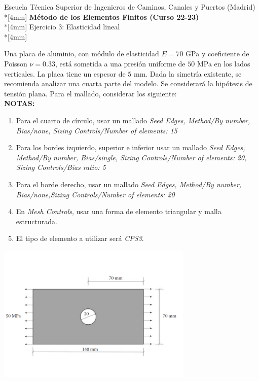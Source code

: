 \documentclass[a4paper,12pt]{article}
\begin{document}
\mbox{}\vspace*{-45mm}

{\centering
{\small\sc Escuela Técnica Superior de Ingenieros de Caminos, Canales y
Puertos (Madrid)}\\*[4mm]
{\Large\bf Método de los Elementos Finitos (Curso 22-23)}\\*[4mm]
Ejercicio 3: Elasticidad lineal \\*[4mm]

}

\vspace{3mm}

Una placa de aluminio, con módulo de elasticidad $E=70$ GPa y coeficiente de Poisson $\nu=0.33$, está sometida a una presión uniforme de $50$ MPa en los lados verticales. La placa tiene un espesor de $5$ mm. Dada la simetría existente, se recomienda analizar una cuarta parte del modelo. Se considerará la hipótesis de tensión plana. Para el mallado, considerar los siguiente:
\\

{\bf NOTAS:}
\begin{enumerate}
\item Para el cuarto de círculo, usar un mallado {\em Seed Edges, Method/By number, Bias/none, Sizing Controls/Number of elements: 15}
\item Para los bordes izquierdo, superior e inferior usar un mallado {\em Seed Edges, Method/By number, Bias/single, Sizing Controls/Number of elements: 20,  Sizing Controls/Bias ratio: 5}
\item Para el borde derecho, usar un mallado {\em Seed Edges, Method/By number, Bias/none,$ $Sizing Controls/Number of elements: 20}
\item En {\em Mesh Controls}, usar una forma de elemento triangular y malla estructurada.
\item El tipo de elemento a utilizar será {\em CPS3}.
\end{enumerate}
\begin{center}
\includegraphics[width=0.70\textwidth]{figura}
\end{center}
\end{document}
